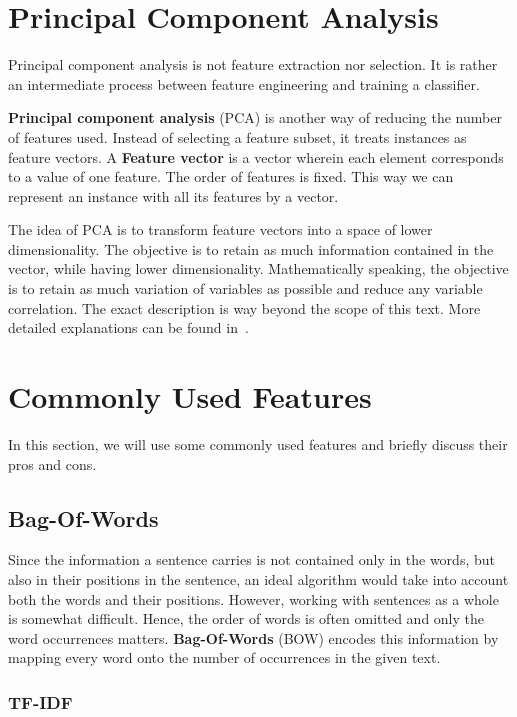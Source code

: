 \section{Principal Component Analysis}

Principal component analysis is not feature extraction nor selection.
It is rather an intermediate process between feature engineering and training a classifier.

\textbf{Principal component analysis} (PCA) is another way of reducing the number of features used.
Instead of selecting a feature subset, it treats instances as feature vectors.
A \textbf{Feature vector} is a vector wherein each element corresponds to a value of one feature.
The order of features is fixed.
This way we can represent an instance with all its features by a vector.

The idea of PCA is to transform feature vectors into a space of lower dimensionality.
The objective is to retain as much information contained in the vector, while
having lower dimensionality.
Mathematically speaking, the objective is to retain as much variation of variables
as possible and reduce any variable correlation.
The exact description is way beyond the scope of this text.
More detailed explanations can be found in~\citet{Jolliffe02}.

\section{Commonly Used Features}

In this section, we will use some commonly used features and briefly discuss their pros and cons.

\subsection{Bag-Of-Words}
\label{subsec:bow}

Since the information a sentence carries is not contained only in the words, but also in their positions in the sentence, an ideal algorithm would take into account both the words and their positions.
However, working with sentences as a whole is somewhat difficult. Hence, the order of words is often omitted and only the word occurrences matters.
\textbf{Bag-Of-Words} (BOW) encodes this information by mapping every word onto the number of occurrences in the given text.

\subsubsection{TF-IDF}

